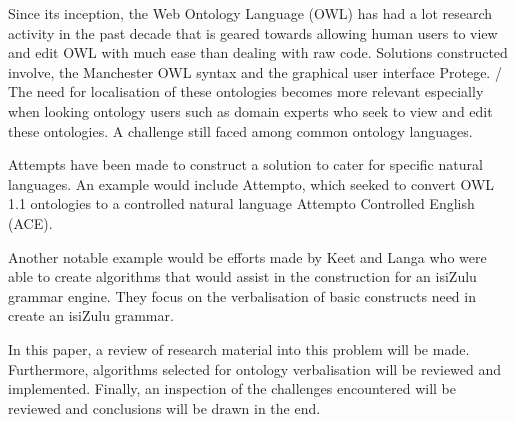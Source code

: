\documentclass[11pt,a4paper]{article}
\begin{document}
Since its inception, the Web Ontology Language (OWL) has had a lot research 
activity in the past decade that is geared towards allowing human users to 
view and edit OWL with much ease than dealing with raw code. Solutions 
constructed involve, the Manchester OWL syntax \cite{RefWorks:36}
and the graphical user interface Protege. \cite{RefWorks:34}
/
The need for localisation of these ontologies becomes more relevant especially
when looking ontology users such as domain experts who seek to view and edit
these ontologies. A challenge still faced among common ontology languages. \cite{RefWorks:33}

Attempts have been made to construct a solution to cater for specific natural 
languages. An example would include Attempto, which seeked to convert OWL 1.1 
ontologies to a controlled natural language Attempto Controlled English (ACE).
\cite{RefWorks:33}

Another notable example would be efforts made by Keet and Langa who were able
to create algorithms that would assist in the construction for an isiZulu 
grammar engine. They focus on the verbalisation of basic constructs need in
create an isiZulu grammar. \cite{RefWorks:35}

In this paper, a review of research material into this problem will be made. 
Furthermore, algorithms selected for ontology verbalisation will be reviewed and
implemented. Finally, an inspection of the challenges encountered will be reviewed
and conclusions will be drawn in the end.



\end{document}
